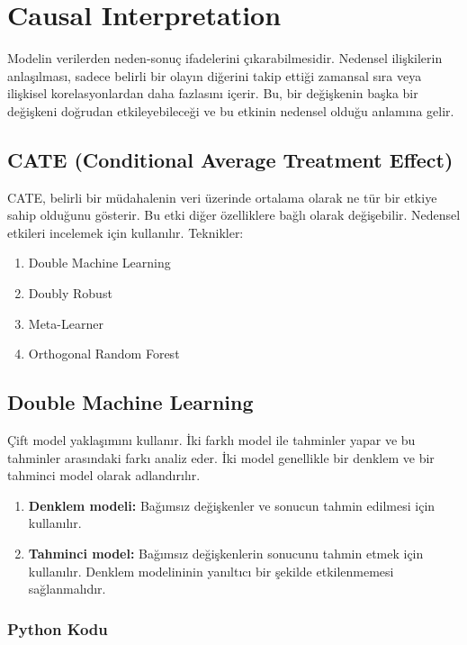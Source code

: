 \section{Causal Interpretation}
Modelin verilerden neden-sonuç ifadelerini çıkarabilmesidir. Nedensel ilişkilerin anlaşılması, sadece belirli bir olayın diğerini takip ettiği zamansal sıra veya ilişkisel korelasyonlardan daha fazlasını içerir. Bu, bir değişkenin başka bir değişkeni doğrudan etkileyebileceği ve bu etkinin nedensel olduğu anlamına gelir.

\newpage

\subsection{CATE (Conditional Average Treatment Effect)}
CATE, belirli bir müdahalenin veri üzerinde ortalama olarak ne tür bir etkiye sahip olduğunu gösterir. Bu etki diğer özelliklere bağlı olarak değişebilir. Nedensel etkileri incelemek için kullanılır. Teknikler:

\begin{enumerate}
    \item Double Machine Learning
    \item Doubly Robust
    \item Meta-Learner
    \item Orthogonal Random Forest
\end{enumerate}

\newpage

\subsection{Double Machine Learning}
Çift model yaklaşımını kullanır. İki farklı model ile tahminler yapar ve bu tahminler arasındaki farkı analiz eder. İki model genellikle bir denklem ve bir tahminci model olarak adlandırılır.

\begin{enumerate}
    \item \textbf{Denklem modeli:} Bağımsız değişkenler ve sonucun tahmin edilmesi için kullanılır.
    \item \textbf{Tahminci model:} Bağımsız değişkenlerin sonucunu tahmin etmek için kullanılır. Denklem modelininin yanıltıcı bir şekilde etkilenmemesi sağlanmalıdır.
\end{enumerate}

\subsubsection{Python Kodu}

